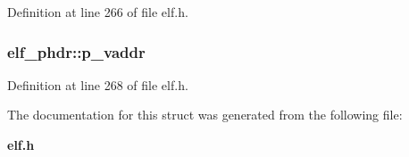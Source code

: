 Definition at line 266 of file elf.h.
\subsubsection[{p\_\-vaddr}]{ {\bf elf\_\-phdr::p\_\-vaddr}}\label{structelf__phdr_1f71bc7eaa119a1153a525cb2a92fbe1}




Definition at line 268 of file elf.h.

The documentation for this struct was generated from the following file:\begin{CompactItemize}
\item 
{\bf elf.h}\end{CompactItemize}
